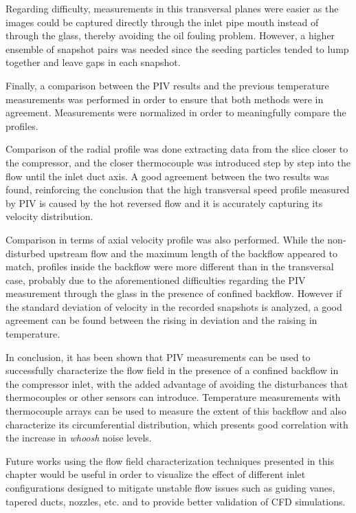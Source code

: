 Regarding difficulty, measurements in this transversal planes were easier as the images could be captured directly through the inlet pipe mouth instead of through the glass, thereby avoiding the oil fouling problem. However, a higher ensemble of snapshot pairs was needed since the seeding particles tended to lump together and leave gaps in each snapshot.

Finally, a comparison between the PIV results and the previous temperature measurements was performed in order to ensure that both methods were in agreement. Measurements were normalized in order to meaningfully compare the profiles.

Comparison of the radial profile was done extracting data from the slice closer to the compressor, and the closer thermocouple was introduced step by step into the flow until the inlet duct axis. A good agreement between the two results was found, reinforcing the conclusion that the high transversal speed profile measured by PIV is caused by the hot reversed flow and it is accurately capturing its velocity distribution.

Comparison in terms of axial velocity profile was also performed. While the non-disturbed upstream flow and the maximum length of the backflow appeared to match, profiles inside the backflow were more different than in the transversal case, probably due to the aforementioned difficulties regarding the PIV measurement through the glass in the presence of confined backflow. However if the standard deviation of velocity in the recorded snapshots is analyzed, a good agreement can be found between the rising in deviation and the raising in temperature.

In conclusion, it has been shown that PIV measurements can be used to successfully characterize the flow field in the presence of a confined backflow in the compressor inlet, with the added advantage of avoiding the disturbances that thermocouples or other sensors can introduce. Temperature measurements with thermocouple arrays can be used to measure the extent of this backflow and also characterize its circumferential distribution, which presents good correlation with the increase in \emph{whoosh} noise levels.

Future works using the flow field characterization techniques presented in this chapter would be useful in order to visualize the effect of different inlet configurations designed to mitigate unstable flow issues such as guiding vanes, tapered ducts, nozzles, etc. and to provide better validation of CFD simulations.
